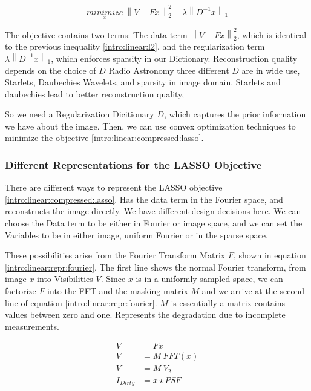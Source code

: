\begin{equation}\label{intro:linear:compressed:lasso}
\underset{x}{minimize} \: \left \| V - Fx \right \|_2^2 + \lambda \left \| D^{-1}x \right \|_1 
\end{equation}

The objective contains two terms: The data term $\left \| V - Fx \right \|_2^2$, which is identical to the previous inequality \eqref{intro:linear:l2}, and the regularization term $\lambda \left \| D^{-1}x \right \|_1$, which enforces sparsity in our Dictionary.
Reconstruction quality depends on the choice of $D$
Radio Astronomy three different $D$ are in wide use, Starlets, Daubechies Wavelets, and sparsity in image domain.
Starlets and daubechies lead to better reconstruction quality, 

So we need a Regularization Dicitionary $D$, which captures the prior information we have about the image. Then, we can use convex optimization techniques to minimize the objective \eqref{intro:linear:compressed:lasso}.


\subsubsection{Different Representations for the LASSO Objective}\label{intro:linear:repr}
There are different ways to represent the LASSO objective \eqref{intro:linear:compressed:lasso}. Has the data term in the Fourier space, and reconstructs the image directly. We have different design decisions here. We can choose the Data term to be either in Fourier or image space, and we can set the Variables to be in either image, uniform Fourier or in the sparse space.

These possibilities arise from the Fourier Transform Matrix $F$, shown in equation \eqref{intro:linear:repr:fourier}. The first line shows the normal Fourier transform, from image $x$ into Visibilities $V$. Since $x$ is in a uniformly-sampled space, we can factorize $F$ into the FFT and the masking matrix $M$ and we arrive at the second line of equation \eqref{intro:linear:repr:fourier}. $M$ is essentially a matrix contains values between zero and one.
Represents the degradation due to incomplete measurements. 

\begin{equation} \label{intro:linear:repr:fourier}
\begin{split}
V &= Fx\\
V &= M\: FFT(x)\\
V &= M\: V_2\\
I_{Dirty} &= x \star PSF
\end{split}
\end{equation}

